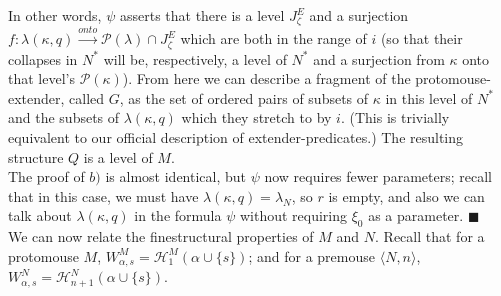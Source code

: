 \documentclass[12pt]{article}
\begin{document}
In other words, $\psi$ asserts that there is a level $J^E_\zeta$ and a surjection $f : \lambda (\kappa , q ) \xrightarrow{onto} \mathcal{P} (\lambda ) \cap J^E_\zeta$ which are both in the range of $i$ (so that their collapses in $N^*$ will be, respectively, a level of $N^*$ and a surjection from $\kappa$ onto that level's $\mathcal{P} (\kappa )$).  From here we can describe a fragment of the protomouse-extender, called $G$, as the set of ordered pairs of subsets of $\kappa$ in this level of $N^*$ and the subsets of $\lambda (\kappa , q)$ which they stretch to by $i$.  (This is trivially equivalent to our official description of extender-predicates.)  The resulting structure $Q$ is a level of $M$.\\

The proof of $b)$ is almost identical, but $\psi$ now requires fewer parameters; recall that in this case, we must have $\lambda ( \kappa , q) = \lambda_N$, so $r$ is empty, and also we can talk about $\lambda (\kappa , q)$ in the formula $\psi$ without requiring $\xi_0$ as a parameter.  $\blacksquare$\\


We can now relate the finestructural properties of $M$ and $N$.  Recall that for a protomouse $M$, $W_{\alpha , s}^M = \mathcal{H}_{1}^M (\alpha \cup \{ s \} )$; and for a premouse $\langle N , n \rangle $, $W_{\alpha , s}^N = \mathcal{H}_{n+1}^N ( \alpha \cup \{ s \} ) $.\\
\end{document}
